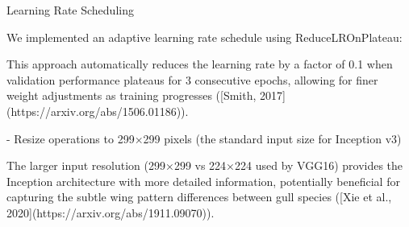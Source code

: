 \documentclass[a4paper,12pt]{article}
\begin{document}


 Learning Rate Scheduling

We implemented an adaptive learning rate schedule using ReduceLROnPlateau:


This approach automatically reduces the learning rate by a factor of 0.1 when validation performance plateaus for 3 consecutive epochs, allowing for finer weight adjustments as training progresses ([Smith, 2017](https://arxiv.org/abs/1506.01186)).



- Resize operations to 299×299 pixels (the standard input size for Inception v3)



The larger input resolution (299×299 vs 224×224 used by VGG16) provides the Inception architecture with more detailed information, potentially beneficial for capturing the subtle wing pattern differences between gull species ([Xie et al., 2020](https://arxiv.org/abs/1911.09070)).





\end{document}
